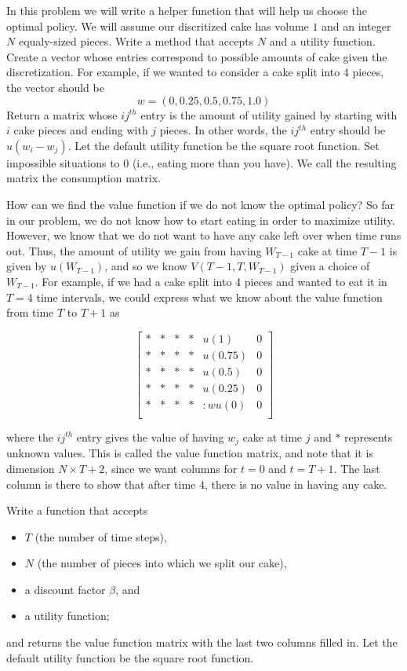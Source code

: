 \begin{problem}

In this problem we will write a helper function that will help us choose the optimal policy.
We will assume our discritized cake has volume $1$ and an integer $N$ equaly-sized pieces.
Write a method that accepts $N$ and a utility function.
Create a vector whose entries correspond to possible amounts of cake given the discretization.
For example, if we wanted to consider a cake split into 4 pieces, the vector should be
\[
w = (0, 0.25, 0.5, 0.75, 1.0)
\]
Return a matrix whose $ij^{th}$ entry is the amount of utility gained by starting with $i$ cake pieces and ending with $j$ pieces.
In other words, the $ij^{th}$ entry should be $u(w_i - w_j)$.
Let the default utility function be the square root function.
Set impossible situations to 0 (i.e., eating more than you have).
We call the resulting matrix the consumption matrix.

\end{problem}

How can we find the value function if we do not know the optimal policy?
So far in our problem, we do not know how to start eating in order to maximize utility.
However, we know that we do not want to have any cake left over when time runs out.
Thus, the amount of utility we gain from having $W_{T-1}$ cake at time $T-1$ is given by $u(W_{T-1})$, and so we know $V(T-1, T, W_{T-1})$ given a choice of $W_{T-1}$.
For example, if we had a cake split into 4 pieces and wanted to eat it in $T=4$ time intervals, we could express what we know about the value function from time $T$ to $T+1$ as

\[
\begin{bmatrix}
* & * & * & * & u(1) & 0 \\
* & * & * & * & u(0.75) & 0 \\
* & * & * & * & u(0.5) & 0 \\
* & * & * & * & u(0.25) & 0 \\
* & * & * & * & :w
u(0) & 0 \\
\end{bmatrix}
\]

where the $ij^{th}$ entry gives the value of having $w_j$ cake at time $j$ and $*$ represents unknown values.  
This is called the value function matrix, and note that it is dimension $N \times T+2$, since we want columns for $t = 0$ and $t = T+1$.
The last column is there to show that after time $4$, there is no value in having any cake.

\begin{problem}
Write a function that accepts 
\begin{itemize}
\item $T$ (the number of time steps),
\item $N$ (the number of pieces into which we split our cake), 
\item a discount factor $\beta$, and
\item a utility function;
\end{itemize}
and returns the value function matrix with the last two columns filled in.
Let the default utility function be the square root function.
\end{problem}

